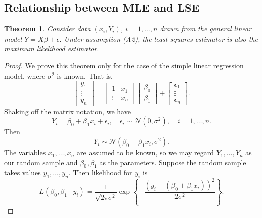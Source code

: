 \documentclass[10pt]{article}
\newtheorem{theorem}{Theorem}
\theoremstyle{definition}
\newcommand{\1}[1]{\textbf{1}_{\left[#1\right]}} %
\begin{document}
\subsection{Relationship between MLE and LSE}
\begin{theorem}
  Consider data $(x_{i},Y_{i})$, $i=1,\ldots,n$ drawn from the general linear
  model $Y=X\beta+\epsilon$. Under assumption (A2), the least squares
  estimator is also the maximum likelihood estimator.
\end{theorem}
\begin{proof}
  We prove this theorem only for the case of the simple linear regression
  model, where $\sigma^{2}$ is known. That is,
  \begin{equation*}
    \begin{bmatrix}
      y_{1}\\\vdots \\ y_{n}
    \end{bmatrix}
    =
    \begin{bmatrix}
      1&x_{1}\\
      \vdots&x_{n}
    \end{bmatrix}
    \begin{bmatrix}
      \beta_{0}\\
      \beta_{1}
    \end{bmatrix}
    +
    \begin{bmatrix}
      \epsilon_{1}\\
      \vdots\\
      \epsilon_{n}
    \end{bmatrix}.
  \end{equation*}
  Shaking off the matrix notation, we have
  \begin{equation*}
    Y_{i} = \beta_{0}+\beta_{1}x_{i}+\epsilon_{i}, \quad \epsilon_{i}\sim \mathcal{N}(0,\sigma^{2}), \quad i=1,\ldots,n.
  \end{equation*}
  Then
  \begin{equation*}
    Y_{i} \sim \mathcal{N}(\beta_{0}+\beta_{1}x_{i}, \sigma^{2}).
  \end{equation*}
  The variables $x_{1},\ldots,x_{n}$ are assumed to be known, so we may regard
  $Y_{1},\ldots,Y_{n}$ as our random sample and $\beta_{0},\beta_{1}$ as the
  parameters. Suppose the random sample takes values $y_{1},\ldots,y_{n}$.
  Then likelihood for $y_{i}$ is
  \begin{equation*}
    L(\beta_{0},\beta_{1}\mid y_{i}) = \frac{1}{\sqrt{2\pi \sigma^{2}}} \exp\left\{-\frac{\left( y_{i}- (\beta_{0}+\beta_{1}x_{i}) \right)^{2} }{2\sigma^{2}} \right\}.

\end{equation*}
\end{proof}
\end{document}
